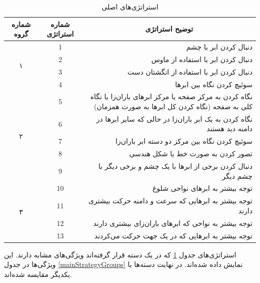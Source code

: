 \documentclass[twoside, a4paper,11pt]{book}
\numberwithin{equation}{chapter}
\numberwithin{table}{chapter}
\numberwithin{figure}{chapter}
\numberwithin{equation}{chapter}
\begin{document}
\begin{table}[]
	\centering
	\caption{استراتژی‌های اصلی}
	\label{StrategyList}
	\begin{scriptsize}
	\begin{center}
	\begin{tabular}{|c|c|r|}
		\hline
\textbf{شماره گروه} & \textbf{شماره استراتژی} & \multicolumn{1}{c|}{\textbf{توضیح استراتژی}} \\ \hline
		\multirow{4}{*}{۱} & 1 & دنبال کردن ابر با چشم \\ \cline{2-3} 
		& 2 & دنبال کردن ابر با استفاده از ماوس \\ \cline{2-3} 
		& 3 & دنبال کردن ابر با استفاده از انگشتان دست \\ \cline{2-3} 
		& 4 & سوئیچ کردن نگاه بین ابرها \\ \hline
		\multirow{5}{*}{۲} & 5 & نگاه کردن به مرکز صفحه یا مرکز ابرهای باران‌زا یا نگاه کلی به صفحه (نگاه کردن کل ابرها به صورت همزمان) \\ \cline{2-3} 
		& 6 & نگاه کردن به یک ابر باران‌زا در حالی که سایر ابرها در دامنه دید هستند \\ \cline{2-3} 
		& 7 & سوئیچ کردن نگاه بین مرکز دو دسته ابر باران‌زا \\ \cline{2-3} 
		& 8 & تصور کردن به صورت خط یا شکل هندسی \\ \cline{2-3} 
		& 9 & دنبال کردن برخی از ابرها با یک چشم و برخی دیگر با چشم دیگر \\ \hline
		\multirow{4}{*}{۳} & 10 & توجه بیشتر به ابرهای نواحی شلوغ \\ \cline{2-3} 
		& 11 & توجه بیشتر به ابرهایی که سرعت و دامنه حرکت بیشتری دارند \\ \cline{2-3} 
		& 12 & توجه بیشتر به نواحی که ابرهای باران‌زای بیشتری دارند \\ \cline{2-3} 
		& 13 & توجه بیشتر به ابرهایی که در یک جهت حرکت می‌کردند \\ \hline
	\end{tabular}
	\end{center}
	\end{scriptsize}
\end{table}

استراتژی‌های جدول \ref{StrategyList} که در یک دسته قرار گرفته‌اند ویژگی‌های مشابه دارند. این ویژگی‌ها در جدول \ref{mainStrategyGroups} نمایش داده شده‌اند. در نهایت دسته‌ها با یکدیگر مقایسه شده‌اند.
\end{document}
